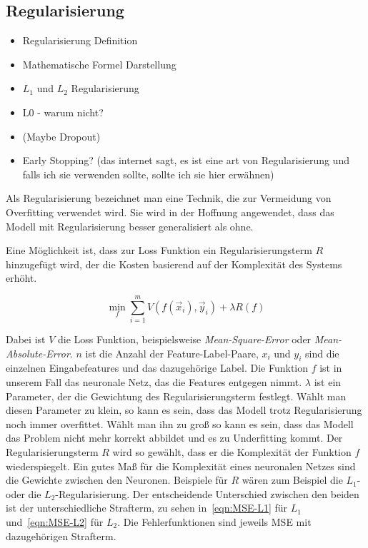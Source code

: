 \subsection{Regularisierung} \label{ssec:Regul}

\color{blue}
\begin{itemize}
	\item Regularisierung Definition
	\item Mathematische Formel Darstellung
	\item \(L_1\) und \(L_2\) Regularisierung
	\item L0 - warum nicht?
	\item (Maybe Dropout)
	\item Early Stopping? (das internet sagt, es ist eine art von Regularisierung und falls ich sie verwenden sollte, sollte ich sie hier erwähnen)
\end{itemize}
\color{black}

Als Regularisierung bezeichnet man eine Technik, die zur Vermeidung von Overfitting verwendet wird.
Sie wird in der Hoffnung angewendet, dass das Modell mit Regularisierung besser generalisiert als ohne.

Eine Möglichkeit ist, dass zur Loss Funktion ein Regularisierungsterm \(R\) hinzugefügt wird, 
der die Kosten basierend auf der Komplexität des Systems erhöht.

\begin{equation}
	\min_f \sum\limits_{i=1}^{m} V(f(\vec{x}_i), \vec{y}_i) + \lambda R(f)
\end{equation} 

Dabei ist \(V\) die Loss Funktion, beispielsweise \textit{Mean-Square-Error} oder \textit{Mean-Absolute-Error}.
\(n\) ist die Anzahl der Feature-Label-Paare,
\(x_i\) und \(y_i\) sind die einzelnen Eingabefeatures und das dazugehörige Label.
Die Funktion \(f\) ist in unserem Fall das neuronale Netz, das die Features entgegen nimmt.
\(\lambda\) ist ein Parameter, der die Gewichtung des Regularisierungsterm festlegt.
Wählt man diesen Parameter zu klein, so kann es sein, dass das Modell trotz Regularisierung noch immer overfittet.
Wählt man ihn zu groß so kann es sein, dass das Modell das Problem nicht mehr korrekt abbildet und es zu Underfitting kommt.
Der Regularisierungsterm \(R\) wird so gewählt, dass er die Komplexität der Funktion \(f\) wiederspiegelt.
Ein gutes Maß für die Komplexität eines neuronalen Netzes sind die Gewichte zwischen den Neuronen.
Beispiele für \(R\) wären zum Beispiel die \(L_1\)- oder die \(L_2\)-Regularisierung. %
Der entscheidende Unterschied zwischen den beiden ist der unterschiedliche Strafterm, zu sehen in~\ref{eqn:MSE-L1} für \(L_1\) und~\ref{eqn:MSE-L2} für \(L_2\). 
Die Fehlerfunktionen sind jeweils MSE mit dazugehörigen Strafterm.

